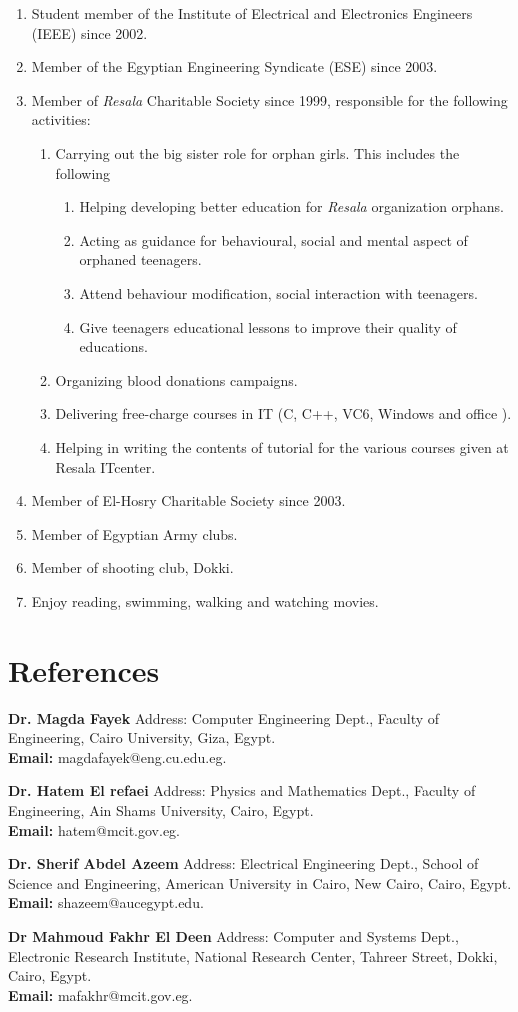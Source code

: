 \documentclass{article}
\begin{document}
\begin{enumerate}
\item  Student member of the Institute of Electrical and Electronics Engineers
(IEEE) since 2002.
\item  Member of the Egyptian Engineering Syndicate (ESE) since 2003.
\item  Member of \textit{Resala} Charitable Society since 1999, responsible for
the following activities:
\begin{enumerate}
\item  Carrying out the big sister role for orphan girls. This includes the following
  \begin{enumerate}
\item Helping developing better education for \textit{Resala} organization
orphans.
\item Acting as guidance for behavioural, social and mental aspect of orphaned
teenagers.
\item Attend behaviour modification, social interaction with teenagers.
\item Give teenagers educational lessons to improve their quality of educations.
\end{enumerate}
\item  Organizing blood donations campaigns.
\item  Delivering free-charge courses in IT (C, C++, VC6, Windows and office ).
\item  Helping in writing the contents of tutorial for the various courses given at Resala ITcenter.
\end{enumerate}
\item  Member of El-Hosry Charitable Society since 2003.
\item  Member of Egyptian Army clubs.
\item  Member of shooting club, Dokki.
\item  Enjoy reading, swimming, walking and watching movies.
\end{enumerate}



\section*{References}
\noindent
\textbf{Dr. Magda Fayek}
 Address: Computer Engineering Dept., Faculty of Engineering, Cairo University, Giza, Egypt.
\\ \textbf{Email: }magdafayek@eng.cu.edu.eg.

\textbf{Dr. Hatem El refaei}
 Address: Physics and Mathematics Dept., Faculty of Engineering, Ain Shams University, Cairo, Egypt.
 \\ \textbf{Email: }hatem@mcit.gov.eg.

\textbf{Dr. Sherif Abdel Azeem}
 Address: Electrical Engineering Dept., School of Science and Engineering,
 American University in Cairo, New Cairo, Cairo, Egypt.\\ \textbf{Email: }
 shazeem@aucegypt.edu.

 \textbf{Dr Mahmoud Fakhr El Deen}
 Address: Computer and Systems Dept., Electronic Research Institute,
 National Research Center, Tahreer Street, Dokki, Cairo, Egypt.\\ \textbf{Email:
 } mafakhr@mcit.gov.eg.
\end{document}
